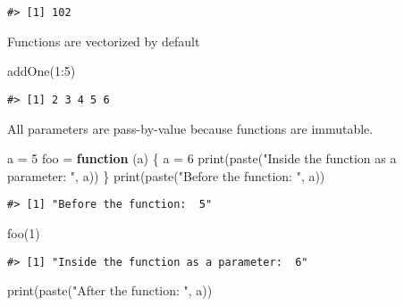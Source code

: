 \documentclass[
]{book}
\newenvironment{Shaded}{\begin{snugshade}}{\end{snugshade}}
\newcommand{\ControlFlowTok}[1]{\textcolor[rgb]{0.13,0.29,0.53}{\textbf{#1}}}
\newcommand{\DecValTok}[1]{\textcolor[rgb]{0.00,0.00,0.81}{#1}}
\newcommand{\FunctionTok}[1]{\textcolor[rgb]{0.00,0.00,0.00}{#1}}
\newcommand{\NormalTok}[1]{#1}
\newcommand{\OtherTok}[1]{\textcolor[rgb]{0.56,0.35,0.01}{#1}}
\newcommand{\SpecialCharTok}[1]{\textcolor[rgb]{0.00,0.00,0.00}{#1}}
\newcommand{\StringTok}[1]{\textcolor[rgb]{0.31,0.60,0.02}{#1}}
\begin{document}
\begin{verbatim}
#> [1] 102
\end{verbatim}

Functions are vectorized by default

\begin{Shaded}
\begin{Highlighting}[]
\FunctionTok{addOne}\NormalTok{(}\DecValTok{1}\SpecialCharTok{:}\DecValTok{5}\NormalTok{)}
\end{Highlighting}
\end{Shaded}

\begin{verbatim}
#> [1] 2 3 4 5 6
\end{verbatim}

All parameters are pass-by-value because functions are immutable.

\begin{Shaded}
\begin{Highlighting}[]
\NormalTok{a }\OtherTok{=} \DecValTok{5}
\NormalTok{foo }\OtherTok{=} \ControlFlowTok{function}\NormalTok{ (a) \{}
\NormalTok{  a }\OtherTok{=} \DecValTok{6}
  \FunctionTok{print}\NormalTok{(}\FunctionTok{paste}\NormalTok{(}\StringTok{"Inside the function as a parameter: "}\NormalTok{, a))}
\NormalTok{\}}
\FunctionTok{print}\NormalTok{(}\FunctionTok{paste}\NormalTok{(}\StringTok{"Before the function: "}\NormalTok{, a))}
\end{Highlighting}
\end{Shaded}

\begin{verbatim}
#> [1] "Before the function:  5"
\end{verbatim}

\begin{Shaded}
\begin{Highlighting}[]
\FunctionTok{foo}\NormalTok{(}\DecValTok{1}\NormalTok{)}
\end{Highlighting}
\end{Shaded}

\begin{verbatim}
#> [1] "Inside the function as a parameter:  6"
\end{verbatim}

\begin{Shaded}
\begin{Highlighting}[]
\FunctionTok{print}\NormalTok{(}\FunctionTok{paste}\NormalTok{(}\StringTok{"After the function: "}\NormalTok{, a))}
\end{Highlighting}
\end{Shaded}
\end{document}
